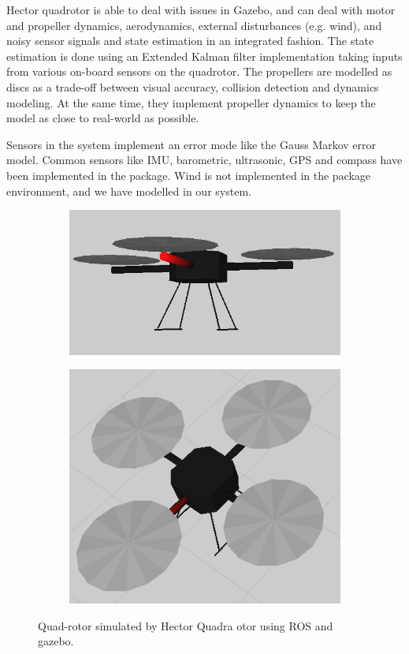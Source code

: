 \documentclass[hidelinks,BTech]{iitmdiss}
\begin{document}
Hector quadrotor is able to deal with issues in Gazebo, and can deal with motor and propeller dynamics, aerodynamics, external disturbances (e.g. wind), and noisy sensor signals and state estimation in an integrated fashion. The state estimation is done using an Extended Kalman filter implementation taking inputs from various on-board sensors on the quadrotor. The propellers are modelled as discs as a trade-off between visual accuracy, collision detection and dynamics modeling. At the same time, they implement propeller dynamics to keep the model as close to real-world as possible.

Sensors in the system implement an error mode like the Gauss Markov error model. Common sensors like IMU, barometric, ultrasonic, GPS and compass have been implemented in the package. Wind is not implemented in the package environment, and we have modelled in our system.

\begin{figure}[H]
  \centering
    \begin{subfigure}[c]{0.45\textwidth}
      \centering
        \includegraphics[width=\textwidth]{quadrotor_sim.png}
    \end{subfigure}
    \begin{subfigure}[c]{0.45\textwidth}
      \centering
        \includegraphics[width=\textwidth]{quadrotor_sim2.png}
    \end{subfigure}
    \caption{Quad-rotor simulated by Hector Quadra
    otor using ROS and gazebo.}
\end{figure}
\end{document}
